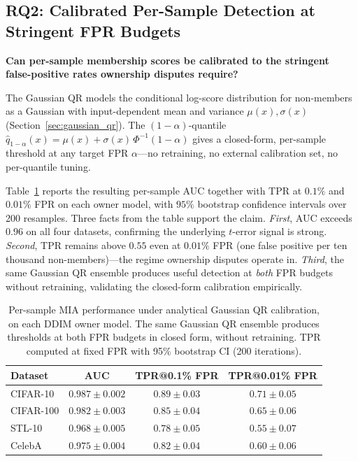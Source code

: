 \documentclass{article}
\begin{document}
\subsection{RQ2: Calibrated Per-Sample Detection at Stringent FPR Budgets}
\label{sec:fpr_control}

\textbf{Can per-sample membership scores be calibrated to the
stringent false-positive rates ownership disputes require?}

The Gaussian QR models the conditional log-score distribution for
non-members as a Gaussian with input-dependent mean and variance
$\mu(x), \sigma(x)$ (Section~\ref{sec:gaussian_qr}). The
$(1{-}\alpha)$-quantile
$\hat{q}_{1-\alpha}(x) = \mu(x) + \sigma(x)\,\Phi^{-1}(1{-}\alpha)$
gives a closed-form, per-sample threshold at any target FPR
$\alpha$---no retraining, no external calibration set, no
per-quantile tuning.

Table~\ref{tab:mia_results} reports the resulting per-sample AUC
together with TPR at $0.1\%$ and $0.01\%$ FPR on each owner model,
with $95\%$ bootstrap confidence intervals over 200 resamples.
Three facts from the table support the claim. \emph{First}, AUC
exceeds $0.96$ on all four datasets, confirming the underlying
$t$-error signal is strong. \emph{Second}, TPR remains above $0.55$
even at $0.01\%$ FPR (one false positive per ten thousand
non-members)---the regime ownership disputes operate in.
\emph{Third}, the same Gaussian QR ensemble produces useful
detection at \emph{both} FPR budgets without retraining, validating
the closed-form calibration empirically.

\begin{table}[t]
\caption{Per-sample MIA performance under analytical Gaussian QR
calibration, on each DDIM owner model. The same Gaussian QR
ensemble produces thresholds at both FPR budgets in closed form,
without retraining. TPR computed at fixed FPR with 95\% bootstrap
CI (200 iterations).}
\label{tab:mia_results}
\centering
\begin{small}
\begin{tabular}{lccc}
\toprule
Dataset & AUC & TPR@0.1\% FPR & TPR@0.01\% FPR \\
\midrule
CIFAR-10  & $0.987 \pm 0.002$ & $0.89 \pm 0.03$ & $0.71 \pm 0.05$ \\
CIFAR-100 & $0.982 \pm 0.003$ & $0.85 \pm 0.04$ & $0.65 \pm 0.06$ \\
STL-10    & $0.968 \pm 0.005$ & $0.78 \pm 0.05$ & $0.55 \pm 0.07$ \\
CelebA    & $0.975 \pm 0.004$ & $0.82 \pm 0.04$ & $0.60 \pm 0.06$ \\
\bottomrule
\end{tabular}
\end{small}
\end{table}
\end{document}
